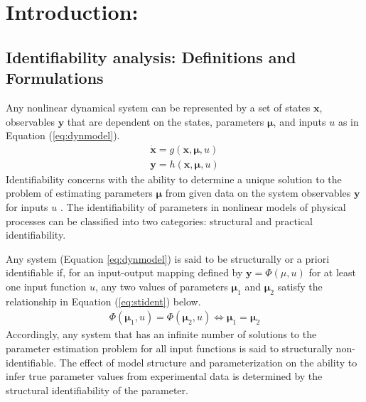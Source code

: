 \documentclass[10pt]{report}
\begin{document}
	\section{Introduction:}
	\subsection{Identifiability analysis: Definitions and Formulations}
	Any nonlinear dynamical system can be represented by a set of states $\mathbf{x}$, observables $\mathbf{y}$ that are dependent on the states, parameters $\mathbf{\mu}$, and inputs $u$ as in Equation (\ref{eq:dynmodel}). 
	\begin{subequations}\label{eq:dynmodel}
		\begin{align}
		\dot{\mathbf{x}} = g(\mathbf{x},\mathbf{\mu},u)\\
		\mathbf{y} = h(\mathbf{x},\mathbf{\mu},u)
		\end{align}
	\end{subequations}
	Identifiability concerns with the ability to determine a unique solution to the problem of estimating parameters $\mathbf{\mu}$ from given data on the system observables $\mathbf{y}$ for inputs $u$ \parencite{McLean2012}.	The identifiability of parameters in nonlinear models of physical processes can be classified into two categories: structural and practical identifiability. 
	
	Any system (Equation \ref{eq:dynmodel}) is said to be structurally or a priori identifiable if, for an input-output mapping defined by $\mathbf{y} = \Phi(\mu,u)$ for at least one input function $u$, any two values of parameters $\mathbf{\mu}_1$ and $\mathbf{\mu}_2$ satisfy the relationship in Equation (\ref{eq:stident}) below.
	\begin{align}\label{eq:stident}
	\Phi(\mathbf{\mu}_1,u) = \Phi(\mathbf{\mu}_2,u) \iff \mathbf{\mu}_1 = \mathbf{\mu}_2
	\end{align}
	Accordingly, any system that has an infinite number of solutions to the parameter estimation problem for all input functions is said to structurally non-identifiable. The effect of model structure and parameterization on the ability to infer true parameter values from experimental data is determined by the structural identifiability of the parameter. 
	
\end{document}
